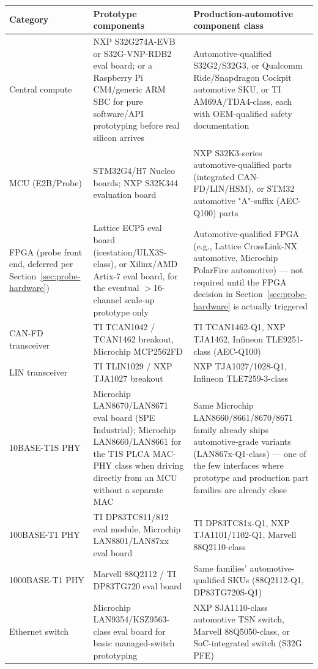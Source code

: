 \begin{center}
\small
\begin{tabularx}{\linewidth}{@{}p{2.6cm} X X@{}}
\toprule
\textbf{Category} & \textbf{Prototype components} & \textbf{Production-automotive component class} \\
\midrule
Central compute & NXP S32G274A-EVB or S32G-VNP-RDB2 eval board; or a Raspberry Pi CM4/generic ARM SBC for pure software/API prototyping before real silicon arrives & Automotive-qualified S32G2/S32G3, or Qualcomm Ride/Snapdragon Cockpit automotive SKU, or TI AM69A/TDA4-class, each with OEM-qualified safety documentation \\
MCU (E2B/Probe) & STM32G4/H7 Nucleo boards; NXP S32K344 evaluation board & NXP S32K3-series automotive-qualified parts (integrated CAN-FD/LIN/HSM), or STM32 automotive "A"-suffix (AEC-Q100) parts \\
FPGA (probe front end, deferred per Section~\ref{sec:probe-hardware}) & Lattice ECP5 eval board (icestation/ULX3S-class), or Xilinx/AMD Artix-7 eval board, for the eventual $>$16-channel scale-up prototype only & Automotive-qualified FPGA (e.g., Lattice CrossLink-NX automotive, Microchip PolarFire automotive) --- not required until the FPGA decision in Section~\ref{sec:probe-hardware} is actually triggered \\
CAN-FD transceiver & TI TCAN1042 / TCAN1462 breakout, Microchip MCP2562FD & TI TCAN1462-Q1, NXP TJA1462, Infineon TLE9251-class (AEC-Q100) \\
LIN transceiver & TI TLIN1029 / NXP TJA1027 breakout & NXP TJA1027/1028-Q1, Infineon TLE7259-3-class \\
10BASE-T1S PHY & Microchip LAN8670/LAN8671 eval board (SPE Industrial); Microchip LAN8660/LAN8661 for the T1S PLCA MAC-PHY class when driving directly from an MCU without a separate MAC & Same Microchip LAN8660/8661/8670/8671 family already ships automotive-grade variants (LAN867x-Q1-class) --- one of the few interfaces where prototype and production part families are already close \\
100BASE-T1 PHY & TI DP83TC811/812 eval module, Microchip LAN8801/LAN87xx eval board & TI DP83TC81x-Q1, NXP TJA1101/1102-Q1, Marvell 88Q2110-class \\
1000BASE-T1 PHY & Marvell 88Q2112 / TI DP83TG720 eval board & Same families' automotive-qualified SKUs (88Q2112-Q1, DP83TG720S-Q1) \\
Ethernet switch & Microchip LAN9354/KSZ9563-class eval board for basic managed-switch prototyping & NXP SJA1110-class automotive TSN switch, Marvell 88Q5050-class, or SoC-integrated switch (S32G PFE) \\

\end{tabularx}
\end{center}
